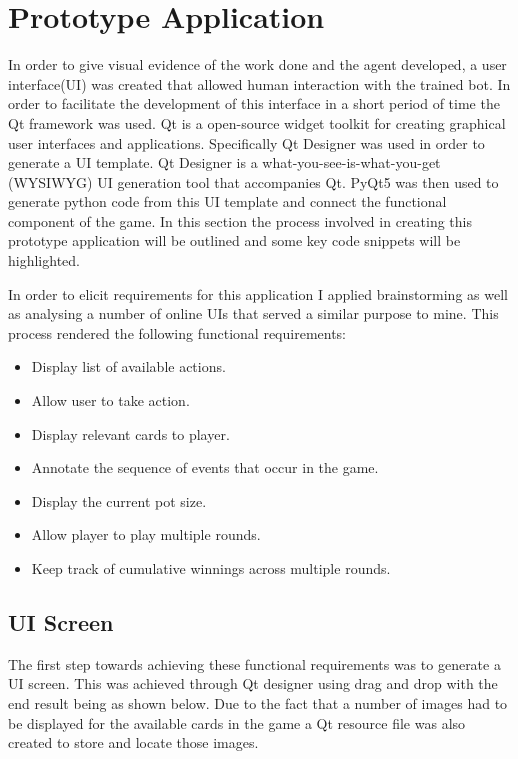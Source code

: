 \section{Prototype Application}\label{sec:prototypeApp}
In order to give visual evidence of the work done and the agent developed, a user interface(UI) was created
that allowed human interaction with the trained bot.
In order to facilitate the development of this interface in a short period of time the Qt framework was used.
Qt is a open-source widget toolkit for creating graphical user interfaces and applications.
Specifically Qt Designer was used in order to generate a UI template.
Qt Designer is a what-you-see-is-what-you-get (WYSIWYG) UI generation tool that accompanies Qt.
PyQt5 was then used to generate python code from this UI template and connect the functional component of the game.
In this section the process involved in creating this prototype application will be outlined
and some key code snippets will be highlighted.

In order to elicit requirements for this application I applied brainstorming as well as analysing a number
of online UIs that served a similar purpose to mine.
This process rendered the following functional requirements:
\begin{itemize}
    \item Display list of available actions.
    \item Allow user to take action.
    \item Display relevant cards to player.
    \item Annotate the sequence of events that occur in the game.
    \item Display the current pot size.
    \item Allow player to play multiple rounds.
    \item Keep track of cumulative winnings across multiple rounds.
\end{itemize}

\subsection{UI Screen}\label{subsec:UiScreen}
The first step towards achieving these functional requirements was to generate a UI screen.
This was achieved through Qt designer using drag and drop with the end result being as shown below.
Due to the fact that a number of images had to be displayed for the available cards in the
game a Qt resource file was also created to store and locate those images.


